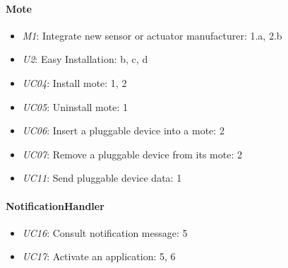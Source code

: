     \paragraph{Mote}
        \begin{itemize}
            \item \emph{M1}: Integrate new sensor or actuator manufacturer: 1.a, 2.b
            \item \emph{U2}: Easy Installation: b, c, d
            \item \emph{UC04}: Install mote: 1, 2
            \item \emph{UC05}: Uninstall mote: 1
            \item \emph{UC06}: Insert a pluggable device into a mote: 2
            \item \emph{UC07}: Remove a pluggable device from its mote: 2
            \item \emph{UC11}: Send pluggable device data: 1
        \end{itemize}

    \paragraph{NotificationHandler}
        \begin{itemize}
            \item \emph{UC16}: Consult notification message: 5
            \item \emph{UC17}: Activate an application: 5, 6
        \end{itemize}

